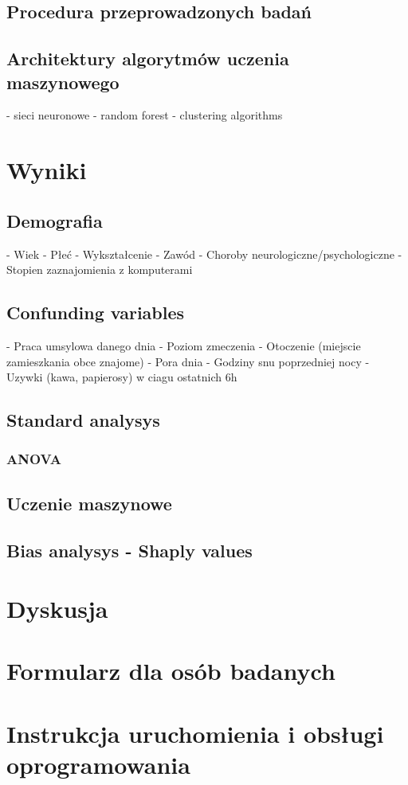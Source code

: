 \documentclass{./assets/wfis}
\begin{document}
\section{Procedura przeprowadzonych badań}
\section{Architektury algorytmów uczenia maszynowego}
- sieci neuronowe
- random forest
- clustering algorithms


\chapter{Wyniki}
\section{Demografia}
- Wiek
- Płeć
- Wykształcenie
- Zawód
- Choroby neurologiczne/psychologiczne
- Stopien zaznajomienia z komputerami
\section{Confunding variables}
- Praca umsylowa danego dnia
- Poziom zmeczenia
- Otoczenie (miejscie zamieszkania obce znajome)
- Pora dnia
- Godziny snu poprzedniej nocy
- Uzywki (kawa, papierosy) w ciagu ostatnich 6h
\section{Standard analysys}
\subsection{ANOVA}
\section{Uczenie maszynowe}
\section{Bias analysys - Shaply values}

\chapter{Dyskusja}

\appendix
\chapter{Formularz dla osób badanych}
\chapter{Instrukcja uruchomienia i obsługi oprogramowania}

\printbibliography

\clearpage
\thispagestyle{empty}
\listoffigures
\listoftables
\clearpage
\end{document}
